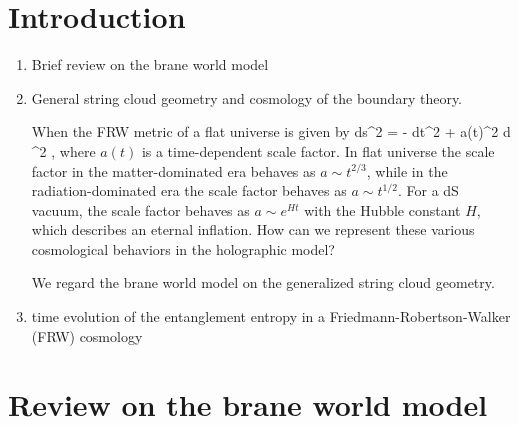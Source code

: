 \documentclass[12pt]{article}
\begin{document}
\renewcommand{\thefootnote}{\arabic{footnote}}
\setcounter{footnote}{0}





\section{Introduction}

\begin{enumerate}

\item  Brief review on the brane  world model

\item General string cloud geometry and cosmology of the boundary theory.

When the FRW metric of a flat universe is given by
\be
ds^2 = - dt^2 + a(t)^2 d ^2 ,
\ee
where $a(t)$ is a time-dependent scale factor.
In flat universe the scale factor in the matter-dominated era behaves as $a \sim t^{2/3}$, while in the radiation-dominated era the scale factor behaves as $a \sim t^{1/2}$. For a dS vacuum, the scale factor behaves as $a \sim e^{H t}$ with the Hubble constant $H$, which describes an eternal inflation. How can we represent these various cosmological behaviors in the holographic model?

We regard the brane world model on the generalized string cloud geometry. 


\item time evolution of the entanglement entropy in a Friedmann-Robertson-Walker (FRW) cosmology


\end{enumerate}



\section{Review on the brane world model }
\end{document}
